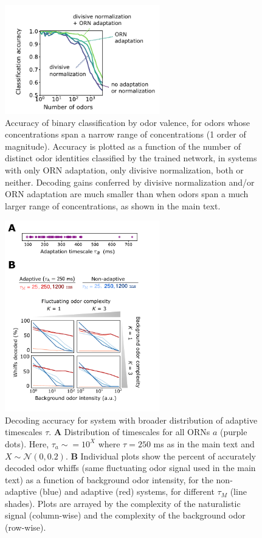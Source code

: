 \documentclass[9pt,twoside]{pnas-new}
\begin{document}
\begin{figure}
    \centering
    \includegraphics[width=0.6\textwidth]{figures/5_downstream_SI.pdf}
    \caption{Accuracy of binary classification  by odor valence, for odors whose concentrations span a narrow range of concentrations (1 order of magnitude). Accuracy is plotted as a function of the number of distinct odor identities classified by the trained network, in systems with only ORN adaptation, only divisive normalization, both or neither. Decoding gains conferred by divisive normalization and/or ORN adaptation are much smaller than when odors span a much larger range of concentrations, as shown in the main text.}
    \label{fig:SI_downstream}
\end{figure}



\begin{figure}
\centering
\includegraphics[width=0.6\textwidth]{figures/temporal_broad_tA.pdf}
\caption{Decoding accuracy for system with broader distribution of adaptive timescales $\tau$.
\textbf{A} Distribution of timescales for all ORNs $a$ (purple dots). Here, $\tau_a \sim = 10^X$ where $\tau = 250$ ms as in the main text and $X \sim \mathcal N(0, 0.2)$. 
\textbf{B}  Individual plots show the percent of accurately decoded odor whiffs (same fluctuating odor signal used in the main text) as a function of background odor intensity, for the non-adaptive (blue) and adaptive (red) systems, for different $\tau_M$ (line shades). Plots are arrayed by the complexity of the naturalistic signal (column-wise) and the complexity of the background odor (row-wise).
}
\label{fig:SI_broad_tA}
\end{figure}
\end{document}
